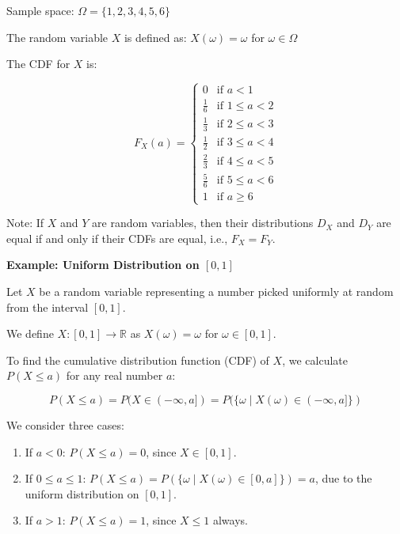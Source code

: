 \documentclass{article}
\begin{document}
    Sample space: $\Omega = \{1, 2, 3, 4, 5, 6\}$

    The random variable $X$ is defined as: $X(\omega) = \omega$ for $\omega \in \Omega$

    The CDF for $X$ is:

    \[
        F_X(a) = 
        \begin{cases} 
            0 & \text{if } a < 1 \\
            \frac{1}{6} & \text{if } 1 \leq a < 2 \\
            \frac{1}{3} & \text{if } 2 \leq a < 3 \\
            \frac{1}{2} & \text{if } 3 \leq a < 4 \\
            \frac{2}{3} & \text{if } 4 \leq a < 5 \\
            \frac{5}{6} & \text{if } 5 \leq a < 6 \\
            1 & \text{if } a \geq 6 
        \end{cases}
    \]

    Note: If $X$ and $Y$ are random variables, then their distributions $D_X$ and $D_Y$ are equal if and only if their CDFs are equal, i.e., $F_X = F_Y$.

    \pagebreak

    \textbf{Example: Uniform Distribution on $[0, 1]$}

    Let $X$ be a random variable representing a number picked uniformly at random from the interval $[0, 1]$.

    
    We define $X: [0, 1] \to \mathbb{R}$ as $X(\omega) = \omega$ for $\omega \in [0, 1]$.

    To find the cumulative distribution function (CDF) of $X$, we calculate $P(X \leq a)$ for any real number $a$:

    \[
    P(X \leq a) = P(X \in (-\infty, a]) = P(\{\omega \mid X(\omega) \in (-\infty, a]\})
    \]

    We consider three cases:

    \begin{enumerate}
        \item If $a < 0$: $P(X \leq a) = 0$, since $X \in [0, 1]$.
        \item If $0 \leq a \leq 1$: $P(X \leq a) = P(\{\omega \mid X(\omega) \in [0, a]\}) = a$, 
              due to the uniform distribution on $[0, 1]$.
        \item If $a > 1$: $P(X \leq a) = 1$, since $X \leq 1$ always.
    \end{enumerate}
\end{document}
